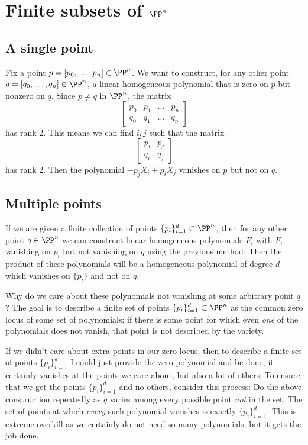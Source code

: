 

\section{Finite subsets of $\PP^n$}
\subsection{A single point}
Fix a point $p=[p_0,\ldots,p_n]\in\PP^n$. We want to construct, for any other point $q=[q_0,\ldots,q_n]\in\PP^n$, a linear homogeneous polynomial that is zero on $p$ but nonzero on $q$. Since $p\neq q$ in $\PP^n$, the matrix
\[
\begin{bmatrix}
    p_0 & p_1 & \dots  & p_n \\
    q_0 & q_1 & \dots  & q_n
\end{bmatrix}
\]
has rank 2. This means we can find $i, j$ such that the matrix
\[
\begin{bmatrix}
    p_i & p_j \\
    q_i & q_j
\end{bmatrix}
\]
has rank 2. Then the polynomial $-p_jX_i + p_iX_j$ vanishes on $p$ but not on $q$.
\subsection{Multiple points}
If we are given a finite collection of points $\{p_i\}_{i=1}^d\subset\PP^n$, then for any other point $q\in\PP^n$ we can construct linear homogeneous polynomials $F_i$ with $F_i$ vanishing on $p_i$ but not vanishing on $q$ using the previous method. Then the product of these polynomials will be a homogeneous polynomial of degree $d$ which vanishes on $\{p_i\}$ and not on $q$.

Why do we care about these polynomials not vanishing at some arbitrary point $q$? The goal is to describe a finite set of points $\{p_i\}_{i=1}^d\subset\PP^n$ as the common zero locus of some set of polynomials; if there is some point for which even \emph{one} of the polynomials does not vanish, that point is not described by the variety.

If we didn't care about extra points in our zero locus, then to describe a finite set of points $\{p_i\}_{i=1}^d$ I could just provide the zero polynomial and be done; it certainly vanishes at the points we care about, but also a lot of others. To ensure that we get the points $\{p_i\}_{i=1}^d$ and no others, consider this process: Do the above construction repeatedly as $q$ varies among every possible point \emph{not} in the set. The set of points at which \emph{every} such polynomial vanishes is exactly $\{p_i\}_{i=1}^d$. This is extreme overkill as we certainly do not need so many polynomials, but it gets the job done.

